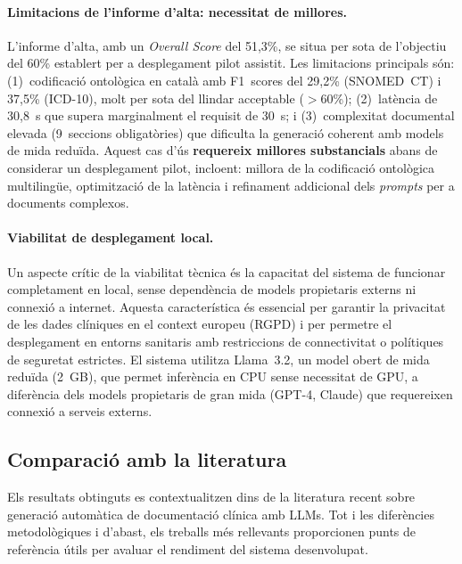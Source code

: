 \documentclass[CAT]{TFUOC}%
\begin{document}
\paragraph{Limitacions de l'informe d'alta: necessitat de millores.}
L'informe d'alta, amb un \textit{Overall Score} del 51,3\%, se situa per sota de l'objectiu del 60\% establert per a desplegament pilot assistit. Les limitacions principals són: (1)~codificació ontològica en català amb F1~scores del 29,2\% (SNOMED~CT) i 37,5\% (ICD-10), molt per sota del llindar acceptable ($>$60\%); (2)~latència de 30,8~s que supera marginalment el requisit de 30~s; i (3)~complexitat documental elevada (9~seccions obligatòries) que dificulta la generació coherent amb models de mida reduïda. Aquest cas d'ús \textbf{requereix millores substancials} abans de considerar un desplegament pilot, incloent: millora de la codificació ontològica multilingüe, optimització de la latència i refinament addicional dels \textit{prompts} per a documents complexos.

\paragraph{Viabilitat de desplegament local.}
Un aspecte crític de la viabilitat tècnica és la capacitat del sistema de funcionar completament en local, sense dependència de models propietaris externs ni connexió a internet. Aquesta característica és essencial per garantir la privacitat de les dades clíniques en el context europeu (RGPD) i per permetre el desplegament en entorns sanitaris amb restriccions de connectivitat o polítiques de seguretat estrictes. El sistema utilitza Llama~3.2, un model obert de mida reduïda (2~GB), que permet inferència en CPU sense necessitat de GPU, a diferència dels models propietaris de gran mida (GPT-4, Claude) que requereixen connexió a serveis externs.

\subsection{Comparació amb la literatura}

Els resultats obtinguts es contextualitzen dins de la literatura recent sobre generació automàtica de documentació clínica amb LLMs. Tot i les diferències metodològiques i d'abast, els treballs més rellevants proporcionen punts de referència útils per avaluar el rendiment del sistema desenvolupat.
\end{document}
